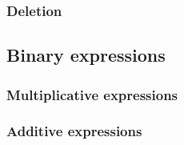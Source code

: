\documentclass[letter,11pt]{article}
\begin{document}
\subsubsection{Deletion}

\subsection{Binary expressions}
\label{sec:interface:binary-expr}

\subsubsection{Multiplicative expressions}

\subsubsection{Additive expressions}
\end{document}
